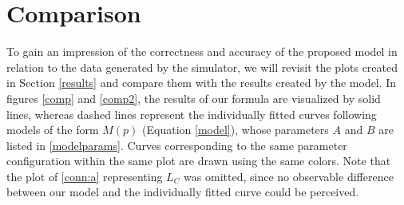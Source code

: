 \documentclass[a4paper,12pt,twoside]{report}
\begin{document}
\section{Comparison} \label{modelcomp}
\begin{sloppypar}
To gain an impression of the correctness and accuracy of the proposed model in relation to the data generated by the simulator, we will revisit the plots created in Section \ref{results} and compare them with the results created by the model. In figures \ref{comp} and \ref{comp2}, the results of our formula are visualized by solid lines, whereas dashed lines represent the individually fitted curves following models of the form $M(p)$ (Equation \ref{model}), whose parameters $A$ and $B$ are listed in \autoref{modelparams}. Curves corresponding to the same parameter configuration within the same plot are drawn using the same colors. Note that the plot of \autoref{conn:a} representing $L_C$ was omitted, since no observable difference between our model and the individually fitted curve could be perceived.\\\\
\end{sloppypar}
\end{document}
